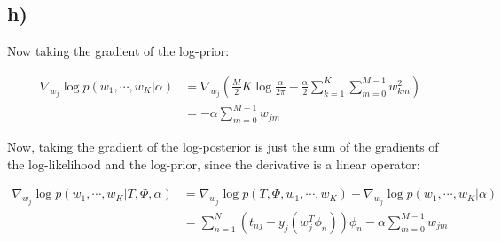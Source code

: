 \documentclass[12pt,a4paper,oneside]{paper}
\begin{document}
\subsection{h)}

Now taking the gradient of the log-prior:

\begin{align*}
    \nabla_{w_j} \log p(w_1, \cdots, w_K | \alpha) &= \nabla_{w_j} \left(\frac{M}{2} K \log \frac{\alpha}{2\pi} - \frac{\alpha}{2} \sum_{k=1}^{K} \sum_{m=0}^{M - 1} w_{km}^2\right) \\
    &= -\alpha \sum_{m=0}^{M - 1} w_{jm}
\end{align*}

Now, taking the gradient of the log-posterior is just the sum of the gradients of the log-likelihood and the log-prior,
since the derivative is a linear operator:

\begin{align*}
    \nabla_{w_j} \log p(w_1, \cdots, w_K | T, \Phi, \alpha) &= \nabla_{w_j} \log p(T, \Phi, w_1, \cdots, w_K) + \nabla_{w_j} \log p(w_1, \cdots, w_K | \alpha) \\
    &= \sum_{n=1}^{N} (t_{nj} - y_j(w_j^T \phi_n)) \phi_n - \alpha \sum_{m=0}^{M - 1} w_{jm}
\end{align*}







\clearpage

\appendix


\newpage
\printbibliography
\end{document}

